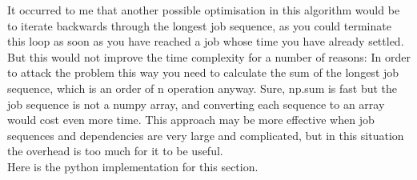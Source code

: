 \documentclass[paper=a4, fontsize=12pt]{scrartcl} %
\numberwithin{equation}{section}       %
\numberwithin{figure}{section}         %
\numberwithin{table}{section}          %
\begin{document}
\bcattention \quad It occurred to me that another possible optimisation in this algorithm would be to iterate backwards through the longest job sequence, as you could terminate this loop as soon as you have reached a job whose time you have already settled. But this would not improve the time complexity for a number of reasons: In order to attack the problem this way you need to calculate the sum of the longest job sequence, which is an order of n operation anyway. Sure, np.sum is fast but the job sequence is not a numpy array, and converting each sequence to an array would cost even more time. This approach may be more effective when job sequences and dependencies are very large and complicated, but in this situation the overhead is too much for it to be useful. \\

Here is the python implementation for this section.
\end{document}
